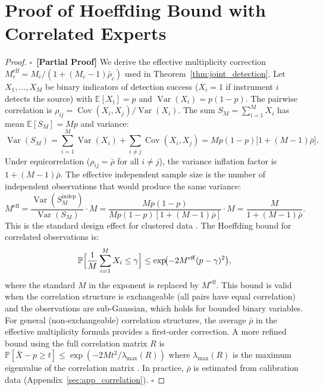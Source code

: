 \documentclass[11pt,a4paper]{article}
\theoremstyle{definition}
\newcommand{\rigorPartial}[0]{$\square$~\textbf{[Partial Proof]}}
\DeclareMathOperator{\Var}{Var}
\DeclareMathOperator{\Cov}{Cov}
\newcommand{\E}{\mathbb{E}}
\newcommand{\Pbb}{\mathbb{P}}
\begin{document}
\section{Proof of Hoeffding Bound with Correlated Experts}
\label{sec:app_hoeffding}
\begin{proof}\rigorPartial
We derive the effective multiplicity correction $M_c^{\mathrm{eff}} = M_c/(1 + (M_c-1)\bar{\rho}_c)$ used in Theorem~\ref{thm:joint_detection}.
Let $X_1, \ldots, X_M$ be binary indicators of detection success ($X_i = 1$ if instrument $i$ detects the source) with $\E[X_i] = p$ and $\Var(X_i) = p(1-p)$. The pairwise correlation is $\rho_{ij} = \Cov(X_i, X_j)/\Var(X_i)$. The sum $S_M = \sum_{i=1}^M X_i$ has mean $\E[S_M] = M p$ and variance:
\begin{equation}
\Var(S_M) = \sum_{i=1}^M \Var(X_i) + \sum_{i \neq j} \Cov(X_i, X_j) = M p(1-p) \bigl[1 + (M-1)\bar{\rho}\bigr].
\end{equation}
Under equicorrelation ($\rho_{ij} = \bar{\rho}$ for all $i \neq j$), the variance inflation factor is $1 + (M-1)\bar{\rho}$. The effective independent sample size is the number of independent observations that would produce the same variance:
\begin{equation}
M^{\mathrm{eff}} = \frac{\Var(S_M^{\mathrm{indep}})}{\Var(S_M)} \cdot M = \frac{M p(1-p)}{M p(1-p)[1 + (M-1)\bar{\rho}]} \cdot M = \frac{M}{1 + (M-1)\bar{\rho}}.
\end{equation}
This is the standard design effect for clustered data \cite{Liang1986}. The Hoeffding bound for correlated observations is:
\begin{equation}
\Pbb\Bigl[\frac{1}{M}\sum_{i=1}^M X_i \leq \gamma\Bigr] \leq \exp\!\bigl(-2 M^{\mathrm{eff}} (p - \gamma)^2\bigr),
\end{equation}
where the standard $M$ in the exponent is replaced by $M^{\mathrm{eff}}$. This bound is valid when the correlation structure is exchangeable (all pairs have equal correlation) and the observations are sub-Gaussian, which holds for bounded binary variables.
For general (non-exchangeable) correlation structures, the average $\bar{\rho}$ in the effective multiplicity formula provides a first-order correction. A more refined bound using the full correlation matrix $R$ is $\Pbb[\bar{X} - p \geq t] \leq \exp(-2 M t^2 / \lambda_{\max}(R))$ where $\lambda_{\max}(R)$ is the maximum eigenvalue of the correlation matrix \cite{Wainwright2019}. In practice, $\bar{\rho}$ is estimated from calibration data (Appendix~\ref{sec:app_correlation}). $\square$
\end{proof}
\end{document}
